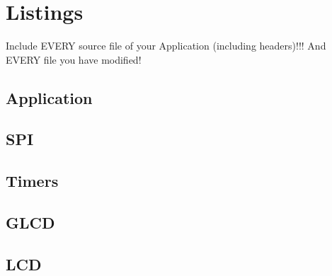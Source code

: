 \documentclass[12pt,a4paper,titlepage,oneside]{article}
\begin{document}
\section{Listings}
\small{

Include EVERY source file of your Application (including headers)!!!
And EVERY file you have modified!

\subsection{Application}



\subsection{SPI}




\subsection{Timers}




\subsection{GLCD}






\subsection{LCD}

}
\end{document}
